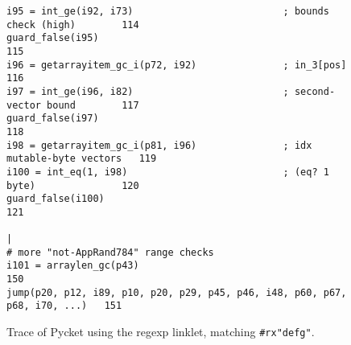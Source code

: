 \begin{figure}[!htbp]
\begin{minipage}{0.95\textwidth}
\begin{lstlisting}[style=rptrace-style]
i95 = int_ge(i92, i73)                          ; bounds check (high)        114
guard_false(i95)                                                             115
i96 = getarrayitem_gc_i(p72, i92)               ; in_3[pos]                  116
i97 = int_ge(i96, i82)                          ; second-vector bound        117
guard_false(i97)                                                             118
i98 = getarrayitem_gc_i(p81, i96)               ; idx mutable-byte vectors   119
i100 = int_eq(1, i98)                           ; (eq? 1 byte)               120
guard_false(i100)                                                            121
                                                                             |
# more "not-AppRand784" range checks
i101 = arraylen_gc(p43)                                                      150
jump(p20, p12, i89, p10, p20, p29, p45, p46, i48, p60, p67, p68, i70, ...)   151
\end{lstlisting}

	\end{minipage}
\caption{\small Trace of Pycket using the regexp linklet, matching
		{\tt\#rx"defg"}.}
\label{fig:regexp-linklet-big-trace}
\end{figure}